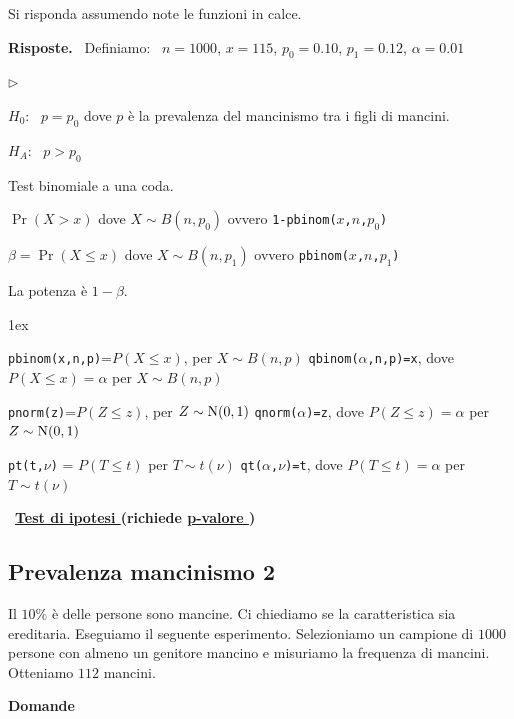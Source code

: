 \documentclass[11pt,openany]{book}
\newcommand{\mylabel}[1]{{\footnotesize\textsf{#1}}\hfill}
\renewenvironment{itemize}
  {\begin{list}{$\triangleright$}{%
   \setlength{\parskip}{0mm}
   \setlength{\topsep}{.2\baselineskip}
   \setlength{\rightmargin}{0mm}
   \setlength{\listparindent}{0mm}
   \setlength{\itemindent}{0mm}
   \setlength{\labelwidth}{3ex}
   \setlength{\itemsep}{.4\baselineskip}
   \setlength{\parsep}{0mm}
   \setlength{\partopsep}{0mm}
   \setlength{\labelsep}{1ex}
   \setlength{\leftmargin}{\labelwidth+\labelsep}
   \let\makelabel\mylabel}}{%
   \end{list}\vspace*{-1.3mm}}
\begin{document}
Si risponda assumendo note le funzioni in calce.

\textbf{Risposte.} \ Definiamo: \ $n=1000$,\hfil
$x=115$,\hfil
$p_0=0.10$,\hfil
$p_1=0.12$,\hfil
$\alpha=0.01$\hfil

\begin{itemize}
\item[1.] $H_0$: \ $p=p_0$ dove $p$ è la prevalenza del mancinismo tra i figli di mancini.
\item[2.] $H_A$: \ $p>p_0$ 
\item[3.] Test binomiale a una coda.
\item[4.] $\Pr(X> x)$ dove $X\sim B(n,p_0)$ ovvero {\tt 1-pbinom($x$,$n$,$p_0$)}
\item[5.] $\beta=\Pr(X\le x)$ dove $X\sim B(n,p_1)$ ovvero {\tt pbinom($x$,$n$,$p_1$)}
\item[6.]  La potenza è $1-\beta$.
\end{itemize}


\vfill
\parskip1ex
{\hrulefill\scriptsize

{\tt pbinom(x,n,p)}=$P(X\le x)$, per $X\sim B(n,p)$
\hfill 
{\tt qbinom($\alpha$,n,p)=x},  dove $P(X\le x)=\alpha$ per $X\sim B(n,p)$

{\tt pnorm(z)}=$P(Z\le z)$, per $Z\sim {\rm N}(0,1)$
\hfill 
{\tt qnorm($\alpha$)=z},  dove $P(Z\le z)=\alpha$ per $Z\sim {\rm N}(0,1)$

{\tt pt(t,$\nu$)} = $P(T\le t)$ per $T\sim t(\nu)$
\hfill
{\tt qt($\alpha$,$\nu$)=t}, dove $P(T\le t)=\alpha$ per $T\sim t(\nu)$

}

\clearpage\
\hfill\textbf{{\color{brown}\hyperref[test_ipotesi]{Test di ipotesi \faShare}} (richiede \hyperref[pvalore]{p-valore \faShare})} 
\subsection{Prevalenza mancinismo 2}
\label{Prevalenza mancinismo 2}

Il $10\%$ è delle persone sono mancine. Ci chiediamo se la caratteristica sia ereditaria. Eseguiamo il seguente esperimento. Selezioniamo un campione di $1000$ persone con almeno un genitore mancino e misuriamo la frequenza di mancini. Otteniamo $112$ mancini. 

\textbf{Domande}
\end{document}
